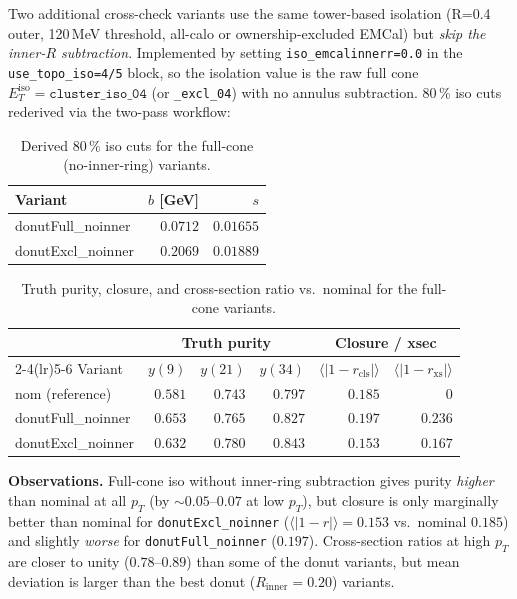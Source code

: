 \documentclass[11pt,a4paper]{article}
\begin{document}
Two additional cross-check variants use the same tower-based isolation
(R=0.4 outer, 120\,MeV threshold, all-calo or ownership-excluded EMCal)
but \emph{skip the inner-$R$ subtraction}. Implemented by setting
\texttt{iso\_emcalinnerr=0.0} in the \texttt{use\_topo\_iso=4/5} block,
so the isolation value is the raw full cone $E_T^\mathrm{iso} =
\texttt{cluster\_iso\_04}$ (or \texttt{\_excl\_04}) with no annulus subtraction.
80\,\% iso cuts rederived via the two-pass workflow:

\begin{table}[H]
\centering
\caption{Derived 80\,\% iso cuts for the full-cone (no-inner-ring) variants.}
\begin{tabular}{lrr}
\toprule
Variant & $b$ [GeV] & $s$ \\
\midrule
donutFull\_noinner & $0.0712$ & $0.01655$ \\
donutExcl\_noinner & $0.2069$ & $0.01889$ \\
\bottomrule
\end{tabular}
\end{table}

\begin{table}[H]
\centering
\caption{Truth purity, closure, and cross-section ratio vs.\ nominal for the
full-cone variants.}
\begin{tabular}{lrrrrr}
\toprule
 & \multicolumn{3}{c}{Truth purity} & \multicolumn{2}{c}{Closure / xsec} \\
\cmidrule(lr){2-4}\cmidrule(lr){5-6}
Variant & $y(9)$ & $y(21)$ & $y(34)$ & $\langle|1-r_\mathrm{cls}|\rangle$ & $\langle|1-r_\mathrm{xs}|\rangle$ \\
\midrule
nom (reference)    & $0.581$ & $0.743$ & $0.797$ & $0.185$ & $0$ \\
donutFull\_noinner & $0.653$ & $0.765$ & $0.827$ & $0.197$ & $0.236$ \\
donutExcl\_noinner & $0.632$ & $0.780$ & $0.843$ & $0.153$ & $0.167$ \\
\bottomrule
\end{tabular}
\end{table}

\textbf{Observations.} Full-cone iso without inner-ring subtraction gives
purity \emph{higher} than nominal at all $p_T$ (by $\sim 0.05$--$0.07$ at
low $p_T$), but closure is only marginally better than nominal for
\texttt{donutExcl\_noinner} ($\langle|1-r|\rangle = 0.153$ vs.\ nominal $0.185$)
and slightly \emph{worse} for \texttt{donutFull\_noinner} ($0.197$).
Cross-section ratios at high $p_T$ are closer to unity ($0.78$--$0.89$) than
some of the donut variants, but mean deviation is larger than the best donut
($R_\mathrm{inner}=0.20$) variants.
\end{document}
